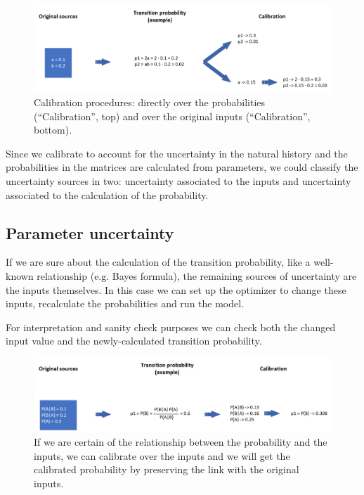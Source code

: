 \begin{figure}[h]
	\centering
	\includegraphics[width=\textwidth]{figures/calibration_inputs}
	\decoRule
	\caption[Calibration over inputs]{Calibration procedures: directly over the probabilities (``Calibration'', top) and over the original inputs (``Calibration'', bottom).}
	\label{fig:calibration_inputs}
\end{figure}

Since we calibrate to account for the uncertainty in the natural history and the probabilities in the matrices are calculated from parameters, we could classify the uncertainty sources in two: uncertainty associated to the inputs and uncertainty associated to the calculation of the probability.

\subsection{Parameter uncertainty}
If we are sure about the calculation of the transition probability, like a well-known relationship (e.g. Bayes formula), the remaining sources of uncertainty are the inputs themselves. In this case we can set up the optimizer to change these inputs, recalculate the probabilities and run the model.

For interpretation and sanity check purposes we can check both the changed input value and the newly-calculated transition probability.

\begin{figure}[h!]
	\centering
	\includegraphics[width=\textwidth]{figures/calibration_values}
	\decoRule
	\caption[Calibration over input values]{If we are certain of the relationship between the probability and the inputs, we can calibrate over the inputs and we will get the calibrated probability by preserving the link with the original inputs.}
	\label{fig:calibration_values}
\end{figure}

